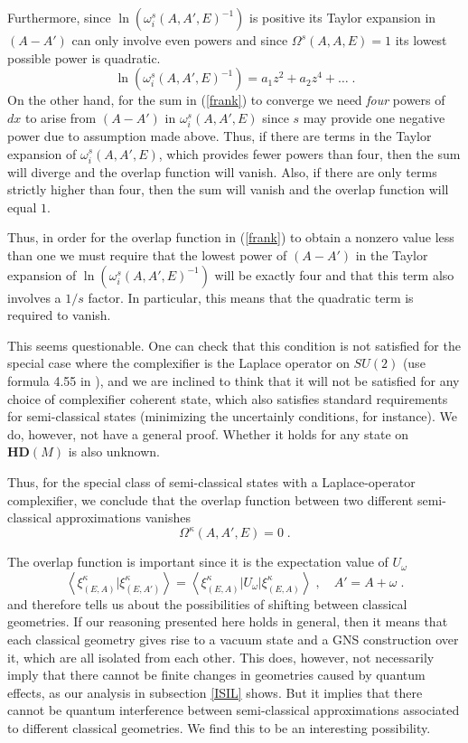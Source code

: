 \documentclass[12pt]{article}
\def\oo{\omega}
\def\OO{\Omega}
\begin{document}
Furthermore, since $\ln \left(\oo^s_i(A,A',E)^{-1} \right) $ is positive its Taylor expansion in $(A-A')$ can only involve even powers and since $\OO^s(A,A,E)=1$ its lowest possible power is quadratic.
$$
\ln \left(\oo^s_i(A,A',E)^{-1} \right)  = a_1 z^2 + a_2 z^4 + \ldots \;. %
$$
On the other hand, for the sum in (\ref{frank}) to converge we need {\it four} powers of $dx$ to arise from $(A-A')$ in $\oo^s_i(A,A',E) $ since $s$ may provide one negative power due to assumption made above. Thus, if there are terms in the Taylor expansion of $ \oo^s_i(A,A',E) $, which provides fewer powers than four, then the sum will diverge and the overlap function will vanish. Also, if there are only terms strictly higher than four, then the sum will vanish and the overlap function will equal $1$. 

Thus, in order for the overlap function in (\ref{frank}) to obtain a nonzero value less than one we must require that the lowest power of $(A-A')$ in the Taylor expansion of $ \ln (\oo^s_i(A,A',E)^{-1}) $  will be exactly four and that this term also involves a $1/s$ factor. In particular, this means that the quadratic term is required to vanish.

This seems questionable. One can check that this condition is not satisfied for the special case where the complexifier is the Laplace operator on $SU(2)$ (use formula 4.55 in \cite{Thiemann:2000ca}), and we are inclined to think that it will not be satisfied for any choice of complexifier coherent state, which also satisfies standard requirements for semi-classical states (minimizing the uncertainly conditions, for instance). We do, however, not have a general proof. Whether it holds for any state on $\mathbf{HD}(M)$ is also unknown.

Thus, for the special class of semi-classical states with a Laplace-operator complexifier, we conclude that the overlap function between two different semi-classical approximations vanishes
$$
\OO^\kappa(A,A',E) = 0\;.
$$


The overlap function is important since it is the expectation value of $U_\oo$
$$
 \left\langle \xi^\kappa_{(E,A)} \vert \xi^\kappa_{(E,A')}  \right\rangle  =  \left\langle \xi^\kappa_{(E,A)} \vert U_{\oo} \vert\xi^\kappa_{(E,A)}  \right\rangle\;, \quad A' = A + \oo\;.
$$
and therefore tells us about the possibilities of shifting between classical geometries. If our reasoning presented here holds in general, then it means that each classical geometry gives rise to a vacuum state and a GNS construction over it, which are all isolated from each other. 
This does, however, not necessarily imply that there cannot be finite changes in geometries caused by quantum effects, as our analysis in subsection \ref{ISIL} shows. But it implies that there cannot be quantum interference between semi-classical approximations associated to different classical geometries. We find this to be an interesting possibility.
\end{document}
